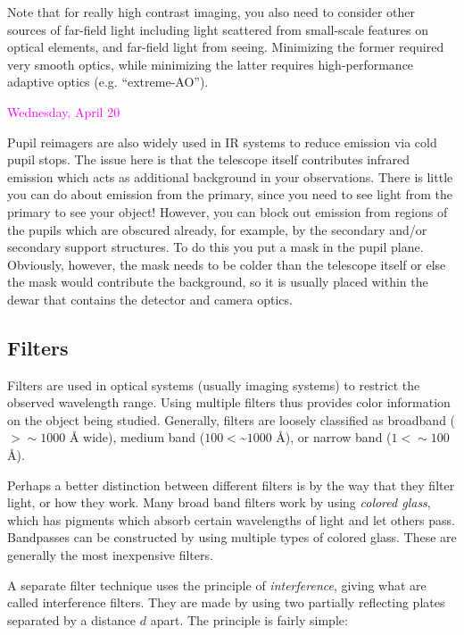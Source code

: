 \documentclass[12pt]{article}
\begin{document}
Note that for really high contrast imaging, you also need to consider
other sources of far-field light including light scattered from
small-scale features on optical elements, and far-field light from
seeing. Minimizing the former required very smooth optics, while
minimizing the latter requires high-performance adaptive optics (e.g.
``extreme-AO'').

\textcolor{magenta}{Wednesday, April 20}

Pupil reimagers are also widely used in IR systems to reduce emission
via cold pupil stops. The issue here is that the telescope itself
contributes infrared emission which acts as additional background in
your observations. There is little you can do about emission from the
primary, since you need to see light from the primary to see your
object! However, you can block out emission from regions of the pupils
which are obscured already, for example, by the secondary and/or
secondary support structures. To do this you put a mask in the pupil
plane. Obviously, however, the mask needs to be colder than the
telescope itself or else the mask would contribute the background, so
it is usually placed within the dewar that contains the detector and
camera optics.

\subsection*{Filters}
Filters are used in optical systems (usually imaging systems) to
restrict the observed wavelength range. Using multiple filters thus
provides color information on the object being studied. Generally,
filters are loosely classified as
broadband ($ > \sim 1000$ \AA{} wide),
medium band ($100 < $\sim$ 1000$ \AA{}), or
narrow band ($1 < \sim 100$ \AA{}).


Perhaps a better distinction between different filters is by the way
that they filter light, or how they work.
Many broad band filters work by using \emph{colored
glass}, which has pigments which absorb certain wavelengths of light
and let others pass. Bandpasses can be constructed by using multiple
types of colored glass. These are generally the most inexpensive
filters.

A separate filter technique uses the principle of \emph{interference},
giving what are called interference filters. They are made by using two
partially reflecting plates separated by a distance $d$ apart. The
principle is fairly simple:
\end{document}
